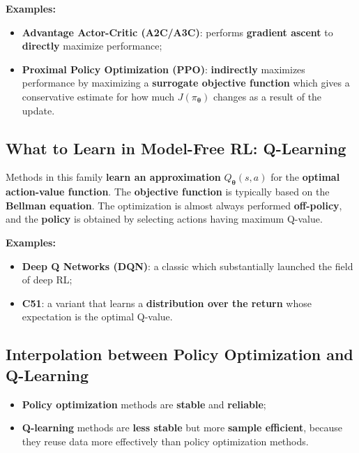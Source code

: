 \documentclass[11pt,a4paper]{article}
\theoremstyle{definition}
\theoremstyle{plain}
\theoremstyle{remark}
\begin{document}
\textbf{Examples:}
\begin{itemize}
    \item \textbf{Advantage Actor-Critic (A2C/A3C)}: performs \textbf{gradient ascent} to \textbf{directly} maximize performance;
    \item \textbf{Proximal Policy Optimization (PPO)}: \textbf{indirectly} maximizes performance by maximizing a \textbf{surrogate objective function} which gives a conservative estimate for how much $J(\pi_{\boldsymbol{\theta}})$ changes as a result of the update.
\end{itemize}

\subsection{What to Learn in Model-Free RL: Q-Learning}

Methods in this family \textbf{learn an approximation} $Q_{\boldsymbol{\theta}}(s, a)$ for the \textbf{optimal action-value function}. The \textbf{objective function} is typically based on the \textbf{Bellman equation}. The optimization is almost always performed \textbf{off-policy}, and the \textbf{policy} is obtained by selecting actions having maximum Q-value.

\textbf{Examples:}
\begin{itemize}
    \item \textbf{Deep Q Networks (DQN)}: a classic which substantially launched the field of deep RL;
    \item \textbf{C51}: a variant that learns a \textbf{distribution over the return} whose expectation is the optimal Q-value.
\end{itemize}

\subsection{Interpolation between Policy Optimization and Q-Learning}

\begin{tcolorbox}[colback=blue!5!white, colframe=blue!60!black, title={Trade-off}]
\begin{itemize}
    \item \textbf{Policy optimization} methods are \textbf{stable} and \textbf{reliable};
    \item \textbf{Q-learning} methods are \textbf{less stable} but more \textbf{sample efficient}, because they reuse data more effectively than policy optimization methods.
\end{itemize}
\end{tcolorbox}
\end{document}
